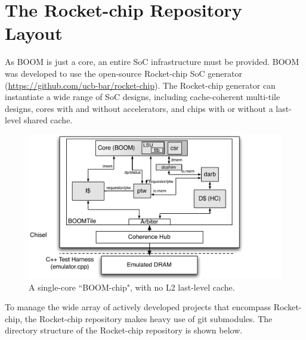 \begin{quote}
\begin{itemize}
\begin{itemize}
\end{itemize}
\end{itemize}
\end{quote}




\section{The Rocket-chip Repository Layout}

As BOOM is just a core, an entire SoC infrastructure must be provided.  BOOM was developed to use the open-source Rocket-chip SoC generator (\url{https://github.com/ucb-bar/rocket-chip}). The Rocket-chip generator can instantiate a wide range of SoC designs, including cache-coherent multi-tile designs, cores with and without accelerators, and chips with or without a last-level shared cache. 




\begin{figure}[ht]
	\centering
	\centerline{\includegraphics[scale =.9] {figures/chip}}
	\caption{ \small A single-core ``BOOM-chip", with no L2 last-level cache.}
	\label{fig:boomchip}
\end{figure}



To manage the wide array of actively developed projects that encompass Rocket-chip, the Rocket-chip repository makes heavy use of git submodules. The directory structure of the Rocket-chip repository is shown below. 


